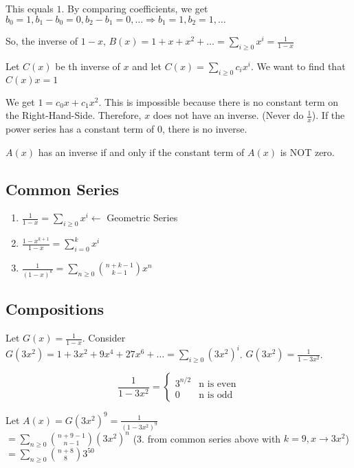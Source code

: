 \documentclass{article}
\begin{document}
This equals $1$. By comparing coefficients, we get $b_0 = 1, b_1 - b_0 = 0, b_2 - b_1 = 0, \dots \Rightarrow b_1 = 1, b_2 = 1, \dots$

So, the inverse of $1-x$, $B(x) = 1 + x + x^2 + \dots = \sum_{i \ge 0} x^i = \frac{1}{1-x}$

\example
Let $C(x)$ be th inverse of $x$ and let $C(x) = \sum_{i \ge 0}c_ix^i$. We want to find that $C(x)x = 1$

We get $1 = c_0x + c_1x^2$. This is impossible because there is no constant term on the Right-Hand-Side. Therefore, $x$ does not have an inverse. (Never do $\frac{1}{x}$). If the power series has a constant term of $0$, there is no inverse. 

\begin{thm}
$A(x)$ has an inverse if and only if the constant term of $A(x)$ is NOT zero.
\end{thm}

\subsection{Common Series}
\begin{enumerate}
	\item $\frac{1}{1-x} = \sum_{i \ge 0} x^i \leftarrow$ Geometric Series
	\item $\frac{1-x^{k+1}}{1-x} = \sum_{i = 0}^{k}x^i$
	\item $\frac{1}{(1-x)^k} = \sum_{n \ge 0} \binom{n+k-1}{k-1}x^n$
\end{enumerate}

\subsection{Compositions}
Let $G(x) = \frac{1}{1-x}$. Consider $G(3x^2) = 1 + 3x^2 + 9x^4 + 27x^6 + \dots = \sum_{i \ge 0}(3x^2)^i$. $G(3x^2) = \frac{1}{1-3x^2}$.

\begin{displaymath}
	[x^n]\frac{1}{1-3x^2} = \left\{
	\begin{array}{lr}
	3^{n/2} & \text{n is even}\\
	0 & \text{n is odd}
	\end{array}
	\right.
\end{displaymath}

Let $A(x) = G(3x^2)^9 = \frac{1}{(1-3x^2)^9}$\\
$= \sum_{n \ge 0} \binom {n+9-1}{n-1}(3x^2)^n$ (3. from common series above with $k=9, x \rightarrow 3x^2$)\\
$= \sum_{n \ge 0} \binom {n+8}8 3^{50}$
\end{document}
